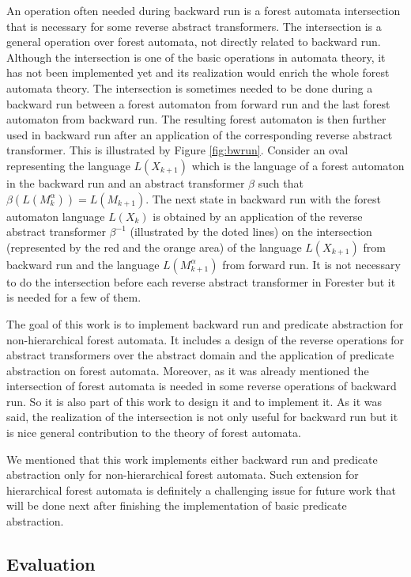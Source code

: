 \documentclass[fleqn,11pt]{ExcelAtFIT} %
\begin{document}
An operation often needed during backward run is a forest automata intersection
that is necessary for some reverse abstract transformers.
The intersection is a general operation over forest automata,
not directly related to backward run.
Although the intersection is one of the basic operations in automata theory,
it has not been implemented yet and its realization would enrich the whole forest automata theory.
The intersection is sometimes needed to be done during a backward run between a forest automaton from forward run
and the last forest automaton from backward run.
The resulting forest automaton is then further used in backward run after an application
of the corresponding reverse abstract transformer.
This is illustrated by Figure \ref{fig:bwrun}.
Consider an oval representing the language $L(X_{k+1})$ which is the language
of a forest automaton in the backward run and an abstract transformer $\beta$ such that $\beta(L(M^{\alpha}_{k})) = L(M_{k+1})$.
The next state in backward run with the forest automaton language $L(X_{k})$ is obtained
by an application of the reverse abstract transformer $\beta^{-1}$ (illustrated by the doted lines) on the intersection
(represented by the red and the orange area) of the language $L(X_{k+1})$ from backward run 
and the language $L(M^{\alpha}_{k+1})$ from forward run.
It is not necessary to do the intersection before each reverse abstract transformer in Forester
but it is needed for a few of them.

The goal of this work is to implement backward run and predicate abstraction
for non-hierarchical forest automata.
It includes a design of the reverse operations for abstract transformers over
the abstract domain and the application of predicate abstraction on forest automata.
Moreover, as it was already mentioned the intersection of forest automata is needed in some reverse
operations of backward run.
So it is also part of this work to design it and to implement it.
As it was said, the realization of the intersection is not only useful for backward run but
it is nice general contribution to the theory of forest automata.

We mentioned that this work implements either backward run and predicate abstraction only for
non-hierarchical forest automata.
Such extension for hierarchical forest automata is definitely a challenging issue for future work
that will be done next after finishing the implementation of basic predicate abstraction.

\subsection{Evaluation}
\end{document}
